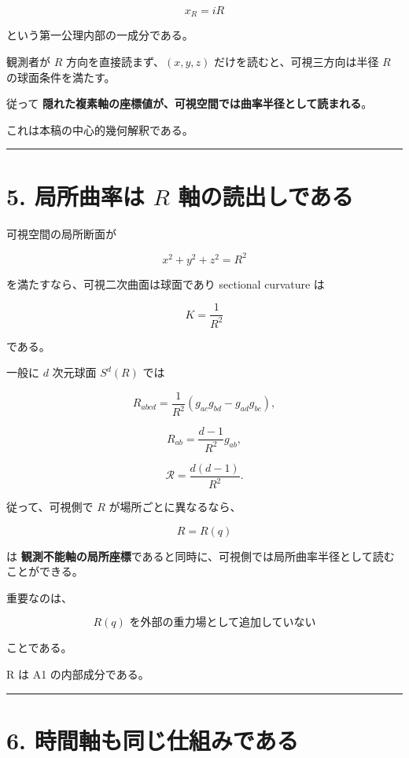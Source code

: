 \documentclass[
  a4paper,
]{ltjsarticle}
\begin{document}
\[
\boxed{
x_R=iR
}
\]

という第一公理内部の一成分である。

観測者が \(R\) 方向を直接読まず、\((x,y,z)\)
だけを読むと、可視三方向は半径 \(R\) の球面条件を満たす。

従って
\textbf{隠れた複素軸の座標値が、可視空間では曲率半径として読まれる}。

これは本稿の中心的幾何解釈である。

\begin{center}\rule{0.5\linewidth}{0.5pt}\end{center}

\section{\texorpdfstring{5. 局所曲率は \(R\)
軸の読出しである}{5. 局所曲率は R 軸の読出しである}}\label{ux5c40ux6240ux66f2ux7387ux306f-r-ux8ef8ux306eux8aadux51faux3057ux3067ux3042ux308b}

可視空間の局所断面が

\[
x^2+y^2+z^2=R^2
\]

を満たすなら、可視二次曲面は球面であり sectional curvature は

\[
\boxed{
K=\frac{1}{R^2}
}
\]

である。

一般に \(d\) 次元球面 \(S^d(R)\) では

\[
R_{abcd}
=
\frac1{R^2}
(g_{ac}g_{bd}-g_{ad}g_{bc}),
\]

\[
R_{ab}
=
\frac{d-1}{R^2}g_{ab},
\]

\[
\boxed{
\mathcal R
=
\frac{d(d-1)}{R^2}
}.
\]

従って、可視側で \(R\) が場所ごとに異なるなら、

\[
R=R(q)
\]

は
\textbf{観測不能軸の局所座標}であると同時に、可視側では局所曲率半径として読むことができる。

重要なのは、

\[
\boxed{
R(q)\text{ を外部の重力場として追加していない}
}
\]

ことである。

R は A1 の内部成分である。

\begin{center}\rule{0.5\linewidth}{0.5pt}\end{center}

\section{6.
時間軸も同じ仕組みである}\label{ux6642ux9593ux8ef8ux3082ux540cux3058ux4ed5ux7d44ux307fux3067ux3042ux308b}
\end{document}
